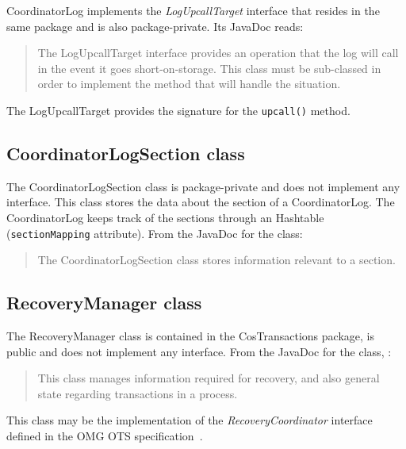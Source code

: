 CoordinatorLog implements the \emph{LogUpcallTarget} interface that resides in the same package and is also package-private. Its JavaDoc reads:
\begin{quote}
    The LogUpcallTarget interface provides an operation that the log will call in the event it goes short-on-storage. This class must be sub-classed in order to implement the method that will handle the situation.
\end{quote}
The LogUpcallTarget provides the signature for the \texttt{upcall()} method.

\subsection{CoordinatorLogSection class}
The CoordinatorLogSection class is package-private and does not implement any interface.
This class stores the data about the section of a CoordinatorLog.
The CoordinatorLog keeps track of the sections through an Hashtable (\texttt{sectionMapping} attribute).
From the JavaDoc for the class:
\begin{quote}
The CoordinatorLogSection class stores information relevant to a section.
\end{quote}

\subsection{RecoveryManager class}
The RecoveryManager class is contained in the CosTransactions package, is public and does not implement any interface. From the JavaDoc for the class, :
\begin{quote}
    This class manages information required for recovery, and also general state regarding transactions in a process.
\end{quote}

This class may be the implementation of the \emph{RecoveryCoordinator} interface defined in the OMG OTS specification~\cite[p. 47]{omg-ots}.
